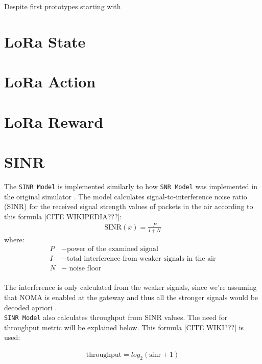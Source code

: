 Despite first prototypes starting with 

\section{LoRa State}
\section{LoRa Action}
\section{LoRa Reward}

\section{SINR}
The \texttt{SINR Model} is implemented similarly to how \texttt{SNR Model} was implemented in the original simulator \cite{simulator}. The model calculates signal-to-interference noise ratio (SINR) for the received signal strength values of packets in the air according to this formula [CITE WIKIPEDIA???]:
\begin{align}
    \text{SINR}(x) = \frac{P}{I + N} \label{eq:sinr}
\end{align}
where:
\begin{align*}
     P &- \text{power of the examined signal}\\
     I &- \text{total interference from weaker signals in the air}\\
     N &- \text{ noise floor}\\
\end{align*}

The interference is only calculated from the weaker signals, since we're assuming that NOMA is enabled at 
the gateway and thus all the stronger signals would be
decoded apriori \cite{noma_original}.\\

\texttt{SINR Model} also calculates throughput from SINR values. The need for throughput metric will be explained below. This formula [CITE WIKI???] is used:

\begin{align}
    \text{throughput} = \text{$log_{2}$}(\text{sinr} + 1)
\end{align}
